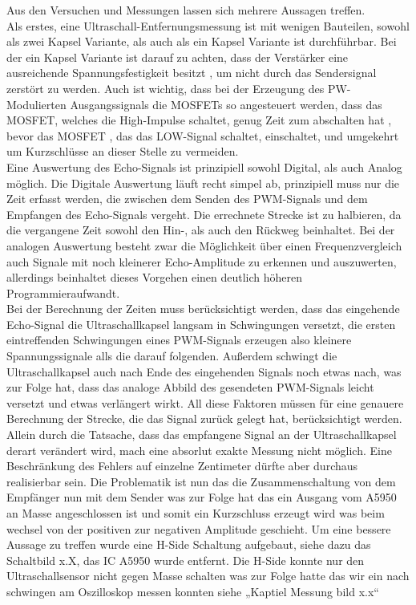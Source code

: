 Aus den Versuchen und Messungen lassen sich mehrere Aussagen treffen. \\
Als erstes, eine Ultraschall-Entfernungsmessung ist mit wenigen Bauteilen, sowohl als zwei Kapsel Variante, als auch als ein Kapsel Variante ist durchführbar. Bei der ein Kapsel Variante ist darauf zu achten, dass der Verstärker eine ausreichende Spannungsfestigkeit besitzt , um nicht durch das Sendersignal zerstört zu werden. Auch ist wichtig, dass bei der Erzeugung des PW-Modulierten Ausgangssignals die MOSFETs so angesteuert werden, dass das MOSFET, welches die High-Impulse schaltet, genug Zeit zum abschalten hat , bevor das MOSFET , das das LOW-Signal schaltet, einschaltet, und umgekehrt um Kurzschlüsse an dieser Stelle zu vermeiden.\\
Eine Auswertung des Echo-Signals ist prinzipiell sowohl Digital, als auch Analog möglich. Die Digitale Auswertung läuft recht simpel ab, prinzipiell muss nur die Zeit erfasst werden, die zwischen dem Senden des PWM-Signals und dem Empfangen des Echo-Signals vergeht. Die errechnete Strecke ist zu halbieren, da die vergangene Zeit sowohl den Hin-, als auch den Rückweg beinhaltet. Bei der analogen Auswertung besteht zwar die Möglichkeit über einen Frequenzvergleich auch Signale mit noch kleinerer Echo-Amplitude zu erkennen und auszuwerten, allerdings beinhaltet dieses Vorgehen einen deutlich höheren Programmieraufwandt.\\
Bei der Berechnung der Zeiten muss berücksichtigt werden, dass das eingehende Echo-Signal die Ultraschallkapsel langsam in Schwingungen versetzt, die ersten eintreffenden Schwingungen eines PWM-Signals erzeugen also kleinere Spannungssignale alls die darauf folgenden. Außerdem schwingt die Ultraschallkapsel auch nach Ende des eingehenden Signals noch etwas nach, was zur Folge hat, dass das analoge Abbild des gesendeten PWM-Signals leicht versetzt und etwas verlängert wirkt. All diese Faktoren müssen für eine genauere Berechnung der Strecke, die das Signal zurück gelegt hat, berücksichtigt werden. Allein durch die Tatsache, dass das empfangene Signal an der Ultraschallkapsel derart verändert wird, mach eine absorlut exakte Messung nicht möglich. Eine Beschränkung des Fehlers auf einzelne Zentimeter dürfte aber durchaus realisierbar sein.
Die Problematik ist nun das die Zusammenschaltung von dem Empfänger nun mit dem Sender was zur Folge hat das ein Ausgang vom A5950 an Masse angeschlossen ist und somit ein Kurzschluss erzeugt wird was beim wechsel von der positiven zur negativen Amplitude geschieht.
Um eine bessere Aussage zu treffen wurde eine H-Side Schaltung aufgebaut, siehe dazu das Schaltbild x.X, das IC A5950 wurde entfernt. Die H-Side konnte nur den Ultraschallsensor nicht gegen Masse schalten was zur Folge hatte das wir ein nach schwingen am Oszilloskop messen konnten siehe „Kaptiel Messung bild x.x“ 
